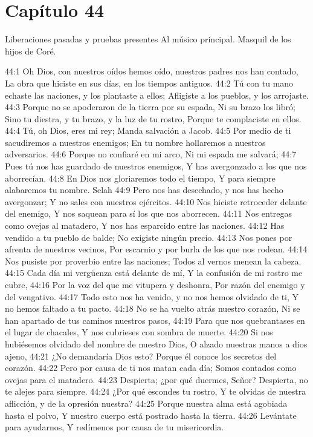 \section*{Capítulo 44}
Liberaciones pasadas y pruebas presentes 
Al músico principal. Masquil de los hijos de Coré. 
 
44:1 Oh Dios, con nuestros oídos hemos oído, nuestros padres nos han contado, 
La obra que hiciste en sus días, en los tiempos antiguos. 
44:2 Tú con tu mano echaste las naciones, y los plantaste a ellos; 
Afligiste a los pueblos, y los arrojaste. 
44:3 Porque no se apoderaron de la tierra por su espada, 
Ni su brazo los libró; 
Sino tu diestra, y tu brazo, y la luz de tu rostro, 
Porque te complaciste en ellos. 
44:4 Tú, oh Dios, eres mi rey; 
Manda salvación a Jacob. 
44:5 Por medio de ti sacudiremos a nuestros enemigos; 
En tu nombre hollaremos a nuestros adversarios. 
44:6 Porque no confiaré en mi arco, 
Ni mi espada me salvará; 
44:7 Pues tú nos has guardado de nuestros enemigos, 
Y has avergonzado a los que nos aborrecían. 
44:8 En Dios nos gloriaremos todo el tiempo, 
Y para siempre alabaremos tu nombre. Selah 
44:9 Pero nos has desechado, y nos has hecho avergonzar; 
Y no sales con nuestros ejércitos. 
44:10 Nos hiciste retroceder delante del enemigo, 
Y nos saquean para sí los que nos aborrecen. 
44:11 Nos entregas como ovejas al matadero, 
Y nos has esparcido entre las naciones. 
44:12 Has vendido a tu pueblo de balde; 
No exigiste ningún precio. 
44:13 Nos pones por afrenta de nuestros vecinos, 
Por escarnio y por burla de los que nos rodean. 
44:14 Nos pusiste por proverbio entre las naciones; 
Todos al vernos menean la cabeza. 
44:15 Cada día mi vergüenza está delante de mí, 
Y la confusión de mi rostro me cubre, 
44:16 Por la voz del que me vitupera y deshonra, 
Por razón del enemigo y del vengativo. 
44:17 Todo esto nos ha venido, y no nos hemos olvidado de ti, 
Y no hemos faltado a tu pacto. 
44:18 No se ha vuelto atrás nuestro corazón, 
Ni se han apartado de tus caminos nuestros pasos, 
44:19 Para que nos quebrantases en el lugar de chacales, 
Y nos cubrieses con sombra de muerte. 
44:20 Si nos hubiésemos olvidado del nombre de nuestro Dios, 
O alzado nuestras manos a dios ajeno, 
44:21 ¿No demandaría Dios esto? 
Porque él conoce los secretos del corazón. 
44:22 Pero por causa de ti nos matan cada día; 
Somos contados como ovejas para el matadero. 
44:23 Despierta; ¿por qué duermes, Señor? 
Despierta, no te alejes para siempre. 
44:24 ¿Por qué escondes tu rostro, 
Y te olvidas de nuestra aflicción, y de la opresión nuestra? 
44:25 Porque nuestra alma está agobiada hasta el polvo, 
Y nuestro cuerpo está postrado hasta la tierra. 
44:26 Levántate para ayudarnos, 
Y redímenos por causa de tu misericordia. 
